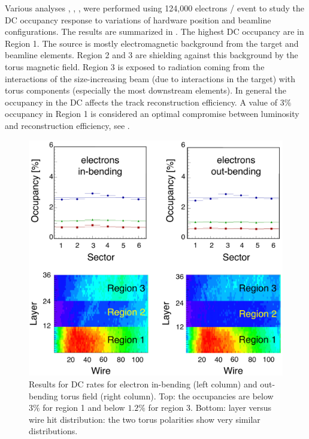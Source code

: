 Various analyses \cite{targetStudy}, \cite{clas12Beamline}, \cite{clas12Background}, were performed using 124,000 electrons / event
to study the DC occupancy response to variations of hardware position and beamline configurations.
The results are summarized in . The highest DC occupancy are in Region 1. The source is mostly electromagnetic background from the target
and beamline elements. Region 2 and 3 are shielding against this background by the torus magnetic field. Region 3 is exposed to radiation coming from
the interactions of the size-increasing beam (due to interactions in the target) with torus components (especially the most downstream elements).
In general the occupancy in the DC affects the track reconstruction efficiency. A value of 3$\%$ occupancy in Region 1
is considered an optimal compromise between luminosity and reconstruction efficiency, see \cite{reco2019}.

\begin{figure}
	\centering
	\includegraphics[width=0.99\columnwidth,keepaspectratio]{img/dcOccupancy.png}
	\caption{Results for DC rates for electron in-bending (left column) and out-bending torus field (right column).
		     Top: the occupancies are below $3\%$ for region 1 and below $1.2\%$ for region 3. Bottom: layer
		     versus wire hit distribution: the two torus polarities show very similar distributions.}
	\label{fig:dcOccupancy}
\end{figure}

